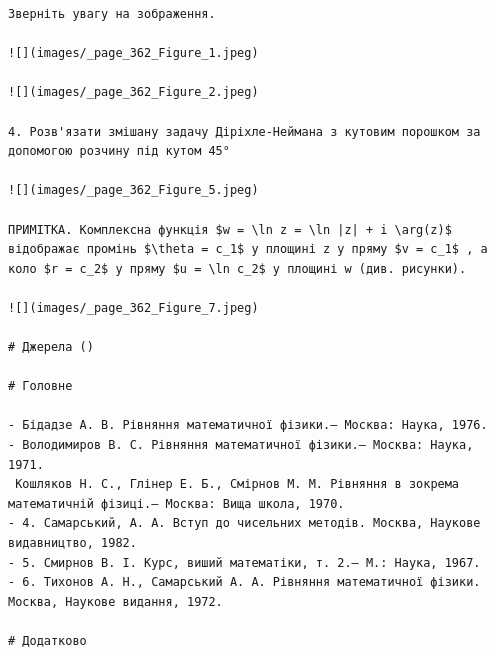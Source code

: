 \documentclass[
  ukrainian,
]{article}
\begin{document}
\begin{verbatim}
Зверніть увагу на зображення.

![](images/_page_362_Figure_1.jpeg)

![](images/_page_362_Figure_2.jpeg)

4. Розв'язати змішану задачу Діріхле-Неймана з кутовим порошком за допомогою розчину під кутом 45°

![](images/_page_362_Figure_5.jpeg)

ПРИМІТКА. Комплексна функція $w = \ln z = \ln |z| + i \arg(z)$ відображає промінь $\theta = c_1$ у площині z у пряму $v = c_1$ , а коло $r = c_2$ у пряму $u = \ln c_2$ у площині w (див. рисунки).

![](images/_page_362_Figure_7.jpeg)

# Джерела ()

# Головне

- Бідадзе А. В. Рівняння математичної фізики.— Москва: Наука, 1976.
- Володимиров В. С. Рівняння математичної фізики.— Москва: Наука, 1971.
 Кошляков Н. С., Глінер Е. Б., Смірнов М. М. Рівняння в зокрема математичній фізиці.— Москва: Вища школа, 1970.
- 4. Самарський, А. А. Вступ до чисельних методів. Москва, Наукове видавництво, 1982.
- 5. Смирнов В. І. Курс, виший математіки, т. 2.— М.: Наука, 1967.
- 6. Тихонов А. Н., Самарський А. А. Рівняння математичної фізики. Москва, Наукове видання, 1972.

# Додатково


\end{verbatim}
\end{document}
